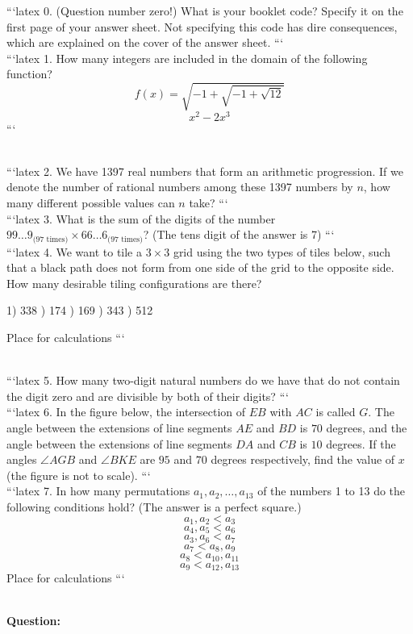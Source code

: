 ```latex
0. (Question number zero!) What is your booklet code? Specify it on the first page of your answer sheet. Not specifying this code has dire consequences, which are explained on the cover of the answer sheet.
```
\\
```latex
1. How many integers are included in the domain of the following function?  
\[ f(x) = \sqrt{-1 + \sqrt{-1 + \sqrt{12}}} \]
\[ x^2 - 2x^3 \]
```

\\
```latex
2. We have 1397 real numbers that form an arithmetic progression. If we denote the number of rational numbers among these 1397 numbers by $n$, how many different possible values can $n$ take?
```
\\
```latex
3. What is the sum of the digits of the number $99\ldots9_{\text{(97 times)}} \times 66\ldots6_{\text{(97 times)}}$? (The tens digit of the answer is 7)
```
\\
```latex
4. We want to tile a $3 \times 3$ grid using the two types of tiles below, such that a black path does not form from one side of the grid to the opposite side. How many desirable tiling configurations are there?

1) 338 ) 174 ) 169 ) 343 ) 512

Place for calculations
```

\\
```latex
5. How many two-digit natural numbers do we have that do not contain the digit zero and are divisible by both of their digits?
```
\\
```latex
6. In the figure below, the intersection of $EB$ with $AC$ is called $G$. The angle between the extensions of line segments $AE$ and $BD$ is $70$ degrees, and the angle between the extensions of line segments $DA$ and $CB$ is $10$ degrees. If the angles $\angle AGB$ and $\angle BKE$ are $95$ and $70$ degrees respectively, find the value of $x$ (the figure is not to scale).
```
\\
```latex
7. In how many permutations $a_1, a_2, \ldots, a_{13}$ of the numbers 1 to 13 do the following conditions hold? (The answer is a perfect square.)
\[ a_1, a_2 < a_3 \]
\[ a_4, a_5 < a_6 \]
\[ a_3, a_6 < a_7 \]
\[ a_7 < a_8, a_9 \]
\[ a_8 < a_{10}, a_{11} \]
\[ a_9 < a_{12}, a_{13} \]
Place for calculations
```

\\
\textbf{Question:}

